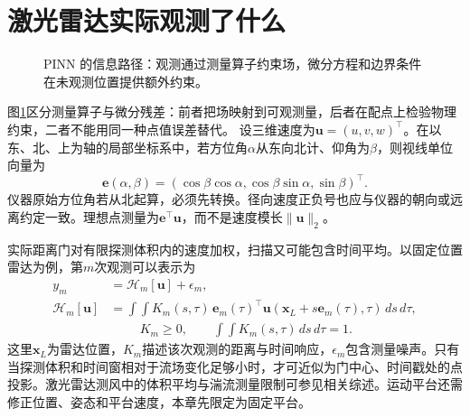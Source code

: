 \section{激光雷达实际观测了什么}
\label{sec:pinn-lidar}
\begin{figure}[htbp]
\centering
{}
\caption{PINN 的信息路径：观测通过测量算子约束场，微分方程和边界条件在未观测位置提供额外约束。}
\label{fig:pinn-constraint-path}
\end{figure}
图\ref{fig:pinn-constraint-path}区分测量算子与微分残差：前者把场映射到可观测量，后者在配点上检验物理约束，二者不能用同一种点值误差替代。
设三维速度为$\mathbf u=(u,v,w)^\top$。在以东、北、上为轴的局部坐标系中，若方位角$\alpha$从东向北计、仰角为$\beta$，则视线单位向量为
\begin{equation}
 \mathbf e(\alpha,\beta)=
 (\cos\beta\cos\alpha,\cos\beta\sin\alpha,\sin\beta)^\top.
\end{equation}
仪器原始方位角若从北起算，必须先转换。径向速度正负号也应与仪器的朝向或远离约定一致。理想点测量为$\mathbf e^\top\mathbf u$，而不是速度模长$\|\mathbf u\|_2$。

实际距离门对有限探测体积内的速度加权，扫描又可能包含时间平均。以固定位置雷达为例，第$m$次观测可以表示为
\begin{align}
 y_m&=\mathcal H_m[\mathbf u]+\epsilon_m,\label{eq:pinn-observation}\\
 \mathcal H_m[\mathbf u]
 &=\int\!\int K_m(s,\tau)\,
 \mathbf e_m(\tau)^\top
 \mathbf u(\mathbf x_L+s\mathbf e_m(\tau),\tau)\,ds\,d\tau,\\
 &\hspace{1cm}K_m\geq0,\qquad \int\!\int K_m(s,\tau)\,ds\,d\tau=1.
\end{align}
这里$\mathbf x_L$为雷达位置，$K_m$描述该次观测的距离与时间响应，$\epsilon_m$包含测量噪声。只有当探测体积和时间窗相对于流场变化足够小时，才可近似为门中心、时间戳处的点投影。激光雷达测风中的体积平均与湍流测量限制可参见相关综述\cite{sathe2013lidar}。运动平台还需修正位置、姿态和平台速度，本章先限定为固定平台。

